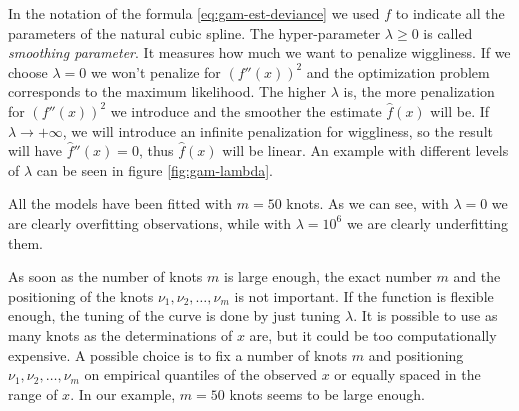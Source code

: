 \documentclass[a4paper, twoside, openright, 12pt]{report}
\let\origfigure\figure
\let\endorigfigure\endfigure
\renewenvironment{figure}[1][2] {
  \expandafter\origfigure\expandafter[!hbtp]
} {
  \endorigfigure
}
\theoremstyle{definition}
\theoremstyle{definition}
\theoremstyle{definition}
\theoremstyle{remark}
\begin{document}
In the notation of the formula \eqref{eq:gam-est-deviance} we used \(f\) to indicate all the parameters of the natural cubic spline. The hyper-parameter \(\lambda\ge0\) is called \emph{smoothing parameter}. It measures how much we want to penalize wiggliness. If we choose \(\lambda=0\) we won't penalize for \(\left( f''(x) \right)^2\) and the optimization problem corresponds to the maximum likelihood. The higher \(\lambda\) is, the more penalization for \(\left( f''(x) \right)^2\) we introduce and the smoother the estimate \(\hat{f}(x)\) will be. If \(\lambda\to+\infty\), we will introduce an infinite penalization for wiggliness, so the result will have \(\hat{f}''(x)=0\), thus \(\hat{f}(x)\) will be linear. An example with different levels of \(\lambda\) can be seen in figure \ref{fig:gam-lambda}.







\begin{figure}[!hbtp]

{\centering {}\newline{}

}

\caption[\ac{gam} estimate \(\hat{f}(x)\) for different levels of the smoothing parameter \(\lambda\).]{\ac{gam} estimate \(\hat{f}(x)\) for different levels of the smoothing parameter \(\lambda\). The higher \(\lambda\) is, the less wiggly the estimated function \(\hat{f}(x)\) is.}\label{fig:gam-lambda}
\end{figure}

All the models have been fitted with \(m = 50\) knots. As we can see, with \(\lambda = 0\) we are clearly overfitting observations, while with \(\lambda = 10^6\) we are clearly underfitting them.

As soon as the number of knots \(m\) is large enough, the exact number \(m\) and the positioning of the knots \(\nu_1, \nu_2, \dots, \nu_m\) is not important. If the function is flexible enough, the tuning of the curve is done by just tuning \(\lambda\). It is possible to use as many knots as the determinations of \(x\) are, but it could be too computationally expensive. A possible choice is to fix a number of knots \(m\) and positioning \(\nu_1, \nu_2, \dots, \nu_m\) on empirical quantiles of the observed \(x\) or equally spaced in the range of \(x\). In our example, \(m=50\) knots seems to be large enough.
\end{document}

